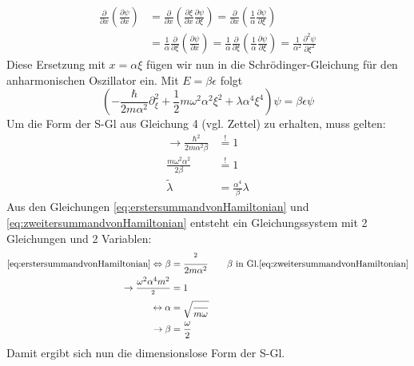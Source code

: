 \begin{equation}
	\begin{split}
		\frac{\partial}{\partial x} \left( \frac{\partial \psi}{\partial x} \right) &= \frac{\partial}{\partial x} \left( \frac{\partial \xi}{\partial x} \frac{\partial \psi}{\partial \xi} \right) = \frac{\partial}{\partial x} \left( \frac{1}{\alpha} \frac{\partial \psi}{\partial \xi} \right) \\
		&= \frac{1}{\alpha} \frac{\partial}{\partial \xi} \left( \frac{\partial \psi}{\partial x} \right) = \frac{1}{\alpha} \frac{\partial}{\partial \xi} \left( \frac{1}{\alpha} \frac{\partial \psi}{\partial \xi} \right) = \frac{1}{\alpha^2} \frac{\partial^2 \psi}{\partial \xi^2}
	\end{split}
	\label{eq:Ableitung umformen}
\end{equation}
Diese Ersetzung mit $x = \alpha \xi$ fügen wir nun in die Schrödinger-Gleichung für den anharmonischen Oszillator ein.
Mit $E = \beta \epsilon$ folgt
\begin{equation}
		\left( - \frac{\hbar}{2m\alpha^2} \partial_{\xi}^2 + \frac{1}{2} m\omega^2\alpha^2\xi^2 + \lambda \alpha^4 \xi^4 \right) \psi = \beta \epsilon \psi
\end{equation}
Um die Form der S-Gl aus Gleichung 4 (vgl. Zettel) zu erhalten, muss gelten:
\begin{align}
	\rightarrow \frac{\hbar^2}{2m\alpha^2\beta}&\stackrel{!}{=} 1 \label{eq:erstersummandvonHamiltonian} \\
	\frac{m\omega^2\alpha^2}{2 \beta} &\stackrel{!}{=} 1 \label{eq:zweitersummandvonHamiltonian}\\
	\tilde{\lambda} &= \frac{\alpha^4}{\beta} \lambda
\end{align}
Aus den Gleichungen \ref{eq:erstersummandvonHamiltonian} und \ref{eq:zweitersummandvonHamiltonian} entsteht ein Gleichungssystem mit 2 Gleichungen und 2 Variablen:
\begin{align}
	\ref{eq:erstersummandvonHamiltonian} \Leftrightarrow \beta &= \frac{\hbar^2}{2m\alpha^2} \qquad \beta \text{ in Gl.}\ref{eq:zweitersummandvonHamiltonian} \\
	\rightarrow \frac{\omega^2 \alpha^4 m^2}{\hbar^2} &= 1 \\
	\leftrightarrow \alpha &= \sqrt{\frac{\hbar}{m\omega}} \\
	\rightarrow \beta &= \frac{\hbar \omega}{2}
\end{align}
Damit ergibt sich nun die dimensionslose Form der S-Gl.
